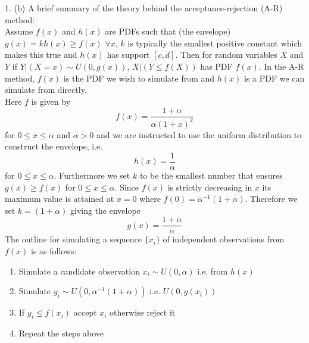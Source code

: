 \documentclass[a4paper,11pt]{article}
\begin{document}
1. (b) A brief summary of the theory behind the acceptance-rejection
(A-R) method:\\
Assume $f(x)$ and $h(x)$ are PDFs such that (the envelope)
$g(x)=kh(x)\ge f(x)$ $\forall x$, $k$ is typically the smallest
positive constant which makes this true
and $h(x)$ has support $[c,d]$. Then for random variables
$X$ and $Y$ if  $Y|(X=x) \sim U(0,g(x))$, $X|(Y\le f(X))$ has PDF
$f(x)$. In the A-R method, $f(x)$ is the PDF we wish to simulate from
and $h(x)$  is a PDF we can simulate from directly.\\
Here $f$ is given by
\begin{equation*}
  f(x) = \frac{1+\alpha}{\alpha(1+x)^2}
\end{equation*}
for $0\le x\le\alpha$ and $\alpha > 0$ and we are instructed to use
the uniform distribution to construct the envelope, i.e.
\begin{equation*}
  h(x) = \frac{1}{\alpha}
\end{equation*}
for $0\le x\le\alpha$. Furthermore we set $k$ to be the smallest
number that ensures $g(x)\ge f(x)$ for $0\le x\le\alpha$. Since $f(x)$
is strictly decreasing in $x$ its maximum value is attained at $x=0$ where
$f(0)=\alpha^{-1}(1+\alpha)$. Therefore we set $k=(1+\alpha)$ giving
the envelope
\begin{equation*}
  g(x) = \frac{1+\alpha}{\alpha}
\end{equation*}
The outline for simulating a sequence $\{x_i\}$ of independent observations from
$f(x)$ is as follows:
\begin{enumerate}
  \item Simulate a candidate observation $x_i \sim U(0,\alpha)$
    i.e. from $h(x)$
  \item Simulate $y_i \sim U(0,\alpha^{-1}(1+\alpha))$ i.e. $U(0,g(x_i))$

  \item If $y_i\le f(x_i)$ accept $x_i$ otherwise reject it
  \item Repeat the steps above
\end{enumerate}
\end{document}
